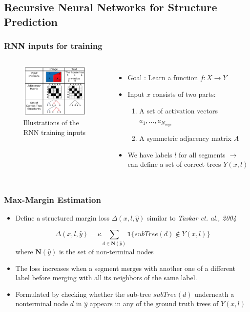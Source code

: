 \documentclass{beamer}
\begin{document}
\subsection{Recursive Neural Networks for Structure Prediction}
\frame
{
	\frametitle{RNN inputs for training}
	\begin{columns}
	\begin{figure}[ht]  
		\begin{center}
			\includegraphics[width=2.1in]{images/fig3.png}   
		\end{center}   
		\caption{Illustrations of the RNN training inputs}
	\end{figure}
	\begin{itemize}
	\item Goal : Learn a function $ f:\textit{X}\rightarrow\textit{Y} $
	\item Input $ x $ consists of two parts:
		\begin{enumerate}
		\item A set of activation vectors ${a_1, \dots, a_{N_{segs}}}$
		\item A symmetric adjacency matrix $ A $
		\end{enumerate}
		\item We have labels $l$ for all segments $\rightarrow$ can define a set of correct trees $Y(x, l)$ 
	\end{itemize}
	\end{columns}
}
\frame
{
	\frametitle{Max-Margin Estimation}
	\begin{itemize}
		\item Define a structured margin loss $\Delta(x,l,\hat{y})$ similar to \textit{Taskar et. al., 2004}
		\begin{Definition}
		$$ \Delta(x,l, \hat{y}) = \kappa \sum_{d \in \textbf{N}(\hat{y})} \textbf{1}\{\textit{subTree}(d) \notin Y(x,l)\}$$
		where $ \textbf{N}(\hat{y}) $ is the set of non-terminal nodes
		\end{Definition}
		\item The loss increases when a segment merges with another one of a different label before merging with all its neighbors of the same label. 
		\item Formulated by checking whether the sub-tree $\textit{subTree}(d)$ underneath a nonterminal node $d$ 
		in $\hat{y}$ appears in any of the ground truth trees of $Y(x,l)$
	\end{itemize}
}
\end{document}

